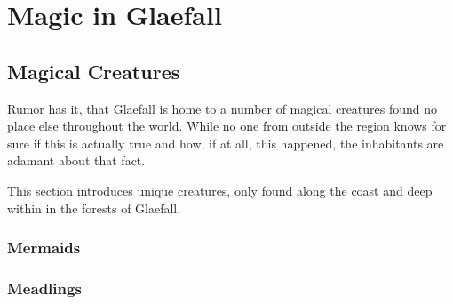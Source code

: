 \chapter{Magic in Glaefall}

\section{Magical Creatures}

Rumor has it, that Glaefall is home to a number of magical creatures found no place else throughout the world.
While no one from outside the region knows for sure if this is actually true and how, if at all, this happened, the inhabitants are adamant about that fact.

This section introduces unique creatures, only found along the coast and deep within in the forests of Glaefall.

\subsection{Mermaids}

\subsection{Meadlings}